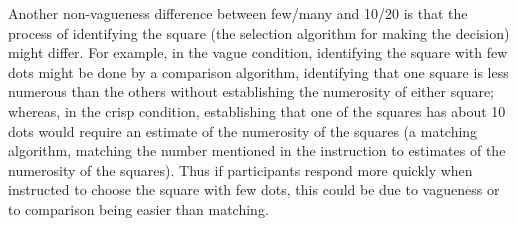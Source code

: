 \documentclass[doc,apacite]{apa6}
\begin{document}
Another non-vagueness  difference between few/many and 10/20 is that the process of identifying the square (the selection algorithm for making the decision) might differ. For example, in the vague condition, identifying the square with few dots might be done by a comparison algorithm, identifying that one square is less numerous than the others without establishing the numerosity of either square; whereas, in the crisp condition, establishing that one of the squares has about 10 dots would require an estimate of the numerosity of the squares (a matching algorithm, matching the number mentioned in the instruction to estimates of the numerosity of the squares). Thus if participants respond more quickly when instructed to choose the square with few dots, this could be due to vagueness or to comparison being easier than matching.
%

\end{document}
